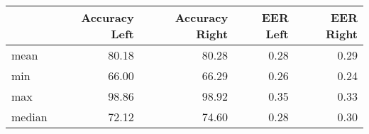 \begin{tabular}{lrrrr}
\toprule
{} &  Accuracy Left &  Accuracy Right &  EER Left &  EER Right \\
\midrule
mean   &          80.18 &           80.28 &      0.28 &       0.29 \\
min    &          66.00 &           66.29 &      0.26 &       0.24 \\
max    &          98.86 &           98.92 &      0.35 &       0.33 \\
median &          72.12 &           74.60 &      0.28 &       0.30 \\
\bottomrule
\end{tabular}
